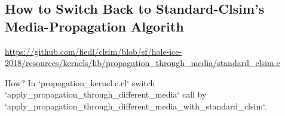 
\subsection{How to Switch Back to Standard-Clsim's Media-Propagation Algorith}
\label{sec:how_to_switch_media_propagation}

\url{https://github.com/fiedl/clsim/blob/sf/hole-ice-2018/resources/kernels/lib/propagation_through_media/standard_clsim.c}

How? In `propagation_kernel.c.cl` switch `apply_propagation_through_different_media` call by `apply_propagation_through_different_media_with_standard_clsim`.

